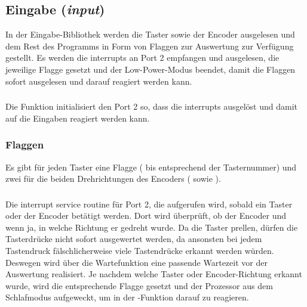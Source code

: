 \subsection{Eingabe (\emph{input})}
In der Eingabe-Bibliothek werden die Taster sowie der Encoder ausgelesen und dem Rest des Programms in Form von Flaggen zur Auswertung zur Verfügung gestellt. Es werden die interrupts an Port 2 empfangen und ausgelesen, die jeweilige Flagge gesetzt und der Low-Power-Modus beendet, damit die Flaggen sofort ausgelesen und darauf reagiert werden kann.
\subsubsection{}
Die Funktion initialisiert den Port 2 so, dass die interrupts ausgelöst und damit auf die Eingaben reagiert werden kann.
\subsubsection{Flaggen}
Es gibt für jeden Taster eine Flagge ( bis  entsprechend der Tasternummer) und zwei für die beiden Drehrichtungen des Encoders ( sowie ).
\subsubsection{}
Die interrupt service routine für Port 2, die aufgerufen wird, sobald ein Taster oder der Encoder betätigt werden. Dort wird überprüft, ob der Encoder und wenn ja, in welche Richtung er gedreht wurde. Da die Taster prellen, dürfen die Tasterdrücke nicht sofort ausgewertet werden, da ansonsten bei jedem Tastendruck fälschlicherweise viele Tastendrücke erkannt werden würden. Deswegen wird über die Wartefunktion  eine passende Wartezeit vor der Auswertung realisiert. Je nachdem welche Taster oder Encoder-Richtung erkannt wurde, wird die entsprechende Flagge gesetzt und der Prozessor aus dem Schlafmodus aufgeweckt, um in der -Funktion darauf zu reagieren.
